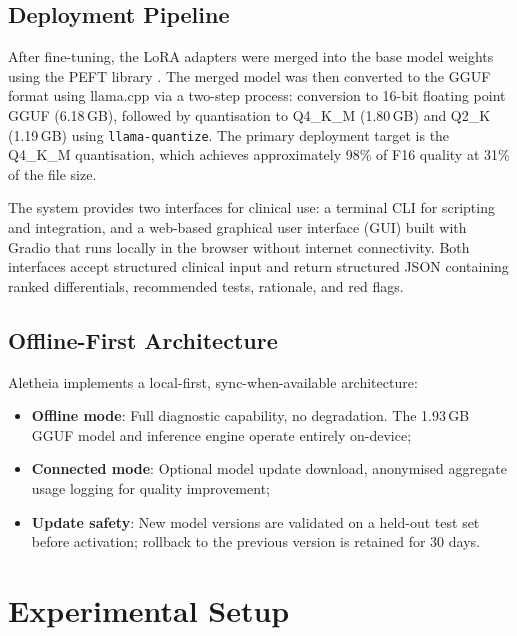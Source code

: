 \documentclass[journal]{IEEEtran}
\begin{document}
\subsection{Deployment Pipeline}

After fine-tuning, the LoRA adapters were merged into the base
model weights using the PEFT library \cite{peft2023}. The merged
model was then converted to the GGUF format using llama.cpp
\cite{gerganov2023llamacpp} via a two-step process: conversion to
16-bit floating point GGUF (6.18\,GB), followed by quantisation
to Q4\_K\_M (1.80\,GB) and Q2\_K (1.19\,GB) using
\texttt{llama-quantize}. The primary deployment target is the
Q4\_K\_M quantisation, which achieves approximately 98\% of F16
quality at 31\% of the file size.

The system provides two interfaces for clinical use: a terminal CLI for scripting and integration, and a web-based graphical user interface (GUI) built with Gradio \cite{aletheia_github} that runs locally in the browser without internet connectivity. Both interfaces accept structured clinical input and return structured JSON containing ranked differentials, recommended tests, rationale, and red flags.

\subsection{Offline-First Architecture}

Aletheia implements a local-first, sync-when-available architecture:
\begin{itemize}
  \item \textbf{Offline mode}: Full diagnostic capability, no
        degradation. The 1.93\,GB GGUF model and inference engine
        operate entirely on-device;
  \item \textbf{Connected mode}: Optional model update download,
        anonymised aggregate usage logging for quality improvement;
  \item \textbf{Update safety}: New model versions are validated on
        a held-out test set before activation; rollback to the
        previous version is retained for 30 days.
\end{itemize}

\section{Experimental Setup}
\label{sec:experiments}
\end{document}
